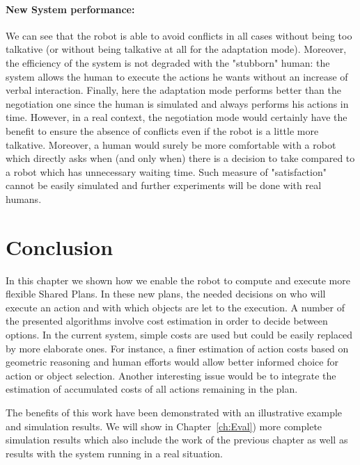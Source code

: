 \documentclass[english,a4paper,11pt,twoside]{StyleThese}
\begin{document}
\paragraph{New System performance:} We can see that the robot is able to avoid conflicts in all cases without being too talkative (or without being talkative at all for the adaptation mode). Moreover, the efficiency of the system is not degraded with the "stubborn" human: the system allows the human to execute the actions he wants without an increase of verbal interaction. 
Finally, here the adaptation mode performs better than the negotiation one since the human is simulated and always performs his actions in time. However, in a real context, the negotiation mode would certainly have the benefit to ensure the absence of conflicts even if the robot is a little more talkative. Moreover, a human would surely be more comfortable with a robot which directly asks when (and only when) there is a decision to take compared to a robot which has unnecessary waiting time. Such measure of "satisfaction" cannot be easily simulated and further experiments will be done with real humans.

\section{Conclusion}

In this chapter we shown how we enable the robot to compute and execute more flexible Shared Plans. In these new plans, the needed decisions on who will execute an action and with which objects are let to the execution. A number of the presented algorithms involve cost estimation in order to decide between options. In the current system, simple costs are used but could be easily replaced by more elaborate ones. For instance, a finer estimation of action costs based on geometric reasoning and human efforts would allow better informed choice for action or object selection. Another interesting issue would be to integrate the estimation of accumulated costs of all actions remaining in the plan.

The benefits of this work have been demonstrated with an illustrative example and simulation results. We will show in Chapter~\ref{ch:Eval}) more complete simulation results which also include the work of the previous chapter as well as results with the system running in a real situation.


\ifdefined{}
\else


\end{document}
